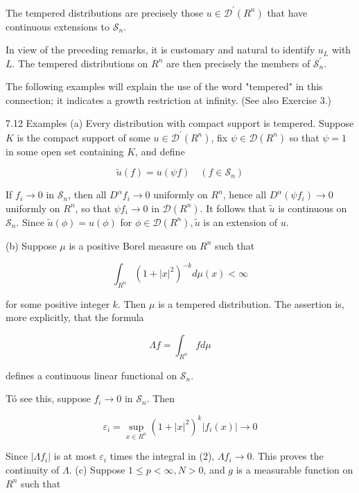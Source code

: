 \documentclass[10pt]{article}
\begin{document}
The tempered distributions are precisely those $u \in \mathscr{D}^{\prime}\left(R^{n}\right)$ that have continuous extensions to $\mathscr{S}_{n}$.

In view of the preceding remarks, it is customary and natural to identify $u_{L}$ with $L$. The tempered distributions on $R^{n}$ are then precisely the members of $\mathscr{S}_{n}^{\prime}$.

The following examples will explain the use of the word "tempered" in this connection; it indicates a growth restriction at infinity. (See also Exercise 3.)

7.12 Examples (a) Every distribution with compact support is tempered. Suppose $K$ is the compact support of some $u \in \mathscr{D}^{\prime}\left(R^{n}\right)$, fix $\psi \in \mathscr{D}\left(R^{n}\right)$ so that $\psi=1$ in some open set containing $K$, and define

$$
\tilde{u}(f)=u(\psi f) \quad\left(f \in \mathscr{S}_{n}\right)
$$

If $f_{i} \rightarrow 0$ in $\mathscr{S}_{n}$, then all $D^{\alpha} f_{i} \rightarrow 0$ uniformly on $R^{n}$, hence all $D^{\alpha}\left(\psi f_{i}\right) \rightarrow 0$ uniformly on $R^{n}$, so that $\psi f_{i} \rightarrow 0$ in $\mathscr{D}\left(R^{n}\right)$. It follows that $\tilde{u}$ is continuous on $\mathscr{S}_{n}$. Since $\tilde{u}(\phi)=u(\phi)$ for $\phi \in \mathscr{D}\left(R^{n}\right), \tilde{u}$ is an extension of $u$.

(b) Suppose $\mu$ is a positive Borel measure on $R^{n}$ such that

$$
\int_{R^{n}}\left(1+|x|^{2}\right)^{-k} d \mu(x)<\infty
$$

for some positive integer $k$. Then $\mu$ is a tempered distribution. The assertion is, more explicitly, that the formula

$$
\Lambda f=\int_{R^{n}} f d \mu
$$

defines a continuous linear functional on $\mathscr{S}_{n}$.

Tó see this, suppose $f_{i} \rightarrow 0$ in $\mathscr{S}_{n}$. Then

$$
\varepsilon_{i}=\sup _{x \in R^{n}}\left(1+|x|^{2}\right)^{k}\left|f_{i}(x)\right| \rightarrow 0
$$

Since $\left|\Lambda f_{i}\right|$ is at most $\varepsilon_{i}$ times the integral in (2), $\Lambda f_{i} \rightarrow 0$. This proves the continuity of $\Lambda$.
(c) Suppose $1 \leq p<\infty, N>0$, and $g$ is a measurable function on $R^{n}$ such that
\end{document}
